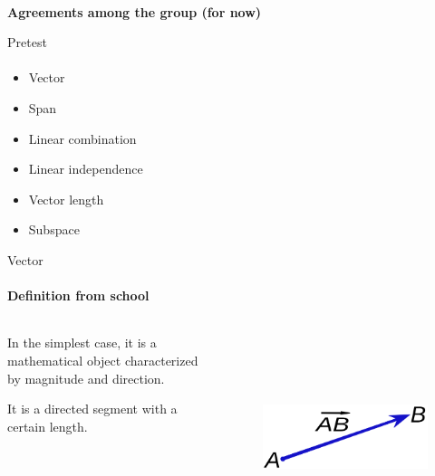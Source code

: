 \documentclass[aspectratio=169,notes]{beamer}
\begin{document}
\begin{frame}[c]{}
    \framesubtitle{}
    \centering\LARGE
    \textbf{Agreements among the group (for now)}
\end{frame}

\begin{frame}[t]{Pretest}
    \framesubtitle{}
    \LARGE
    \begin{multicols}{2}
        \begin{itemize}
            \item Vector
            \item Span
            \item Linear combination
            \item Linear independence
            \item Vector length
            \item Subspace
        \end{itemize}
    \end{multicols}
\end{frame}

\begin{frame}[t]{Vector}
    \framesubtitle{Definition from school}
    \begin{columns}[T,onlytextwidth]
        \begin{column}{0.49\textwidth}
            In the simplest case, it is a mathematical object characterized by magnitude and direction.

            It is a directed segment with a certain length.
        \end{column}
        \begin{column}{0.49\textwidth}
            \begin{figure}[H]
                \centering\includegraphics[height=6cm,width=1\textwidth,keepaspectratio]{resources/Vector_AB_from_A_to_B.svg.png}
                \label{fig:resources/Vector_AB_from_A_to_B.svg.png}
            \end{figure}
        \end{column}
    \end{columns}
\end{frame}
\end{document}
